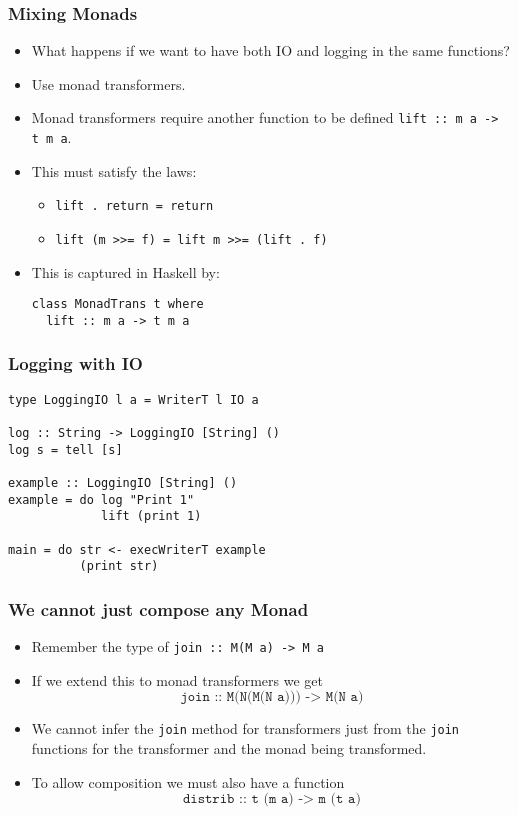 \documentclass{beamer} %
\begin{document}
\begin{frame}[fragile]\frametitle{Mixing Monads}
  \begin{itemize}
    \item What happens if we want to have both IO and logging in the same functions?

    \item Use monad transformers.

    \item Monad transformers require another function to be defined \texttt{lift :: m a -> t m a}.

    \item This must satisfy the laws:
      \begin{itemize}
        \item \texttt{lift . return = return}

        \item \texttt{lift (m >>= f) = lift m >>= (lift . f)}
      \end{itemize}

    \item This is captured in Haskell by:
\begin{verbatim}
class MonadTrans t where
  lift :: m a -> t m a
\end{verbatim}
  \end{itemize}
\end{frame}

\begin{frame}[fragile]\frametitle{Logging with IO}
\begin{verbatim}
type LoggingIO l a = WriterT l IO a

log :: String -> LoggingIO [String] ()
log s = tell [s]

example :: LoggingIO [String] ()
example = do log "Print 1"
             lift (print 1)

main = do str <- execWriterT example
          (print str)
\end{verbatim}
\end{frame}

\begin{frame}[fragile]\frametitle{We cannot just compose any Monad}
\begin{itemize}
  \item Remember the type of \texttt{join :: M(M a) -> M a}

  \item If we extend this to monad transformers we get \[\texttt{join :: M(N(M(N a))) -> M(N a)}\]

  \item We cannot infer the \texttt{join} method for transformers just from the \texttt{join} functions for
        the transformer and the monad being transformed.

  \item To allow composition we must also have a function \[\texttt{distrib :: t (m a) -> m (t a)}\]
\end{itemize}
\end{frame}
\end{document}
